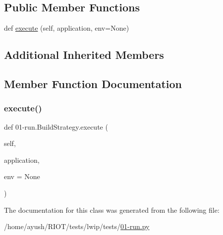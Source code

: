 \subsection*{Public Member Functions}
\begin{DoxyCompactItemize}
\item 
def \hyperlink{class01-run_1_1BuildStrategy_a4b00add3bd7274effbc45e45110d685c}{execute} (self, application, env=None)
\end{DoxyCompactItemize}
\subsection*{Additional Inherited Members}


\subsection{Member Function Documentation}
\mbox{\label{class01-run_1_1BuildStrategy_a4b00add3bd7274effbc45e45110d685c}} 
\subsubsection{\texorpdfstring{execute()}{execute()}}
{\footnotesize\ttfamily def 01-\/run.\+Build\+Strategy.\+execute (\begin{DoxyParamCaption}\item[{}]{self,  }\item[{}]{application,  }\item[{}]{env = {\ttfamily None} }\end{DoxyParamCaption})}



The documentation for this class was generated from the following file\+:\begin{DoxyCompactItemize}
\item 
/home/ayush/\+R\+I\+O\+T/tests/lwip/tests/\hyperlink{lwip_2tests_201-run_8py}{01-\/run.\+py}\end{DoxyCompactItemize}
